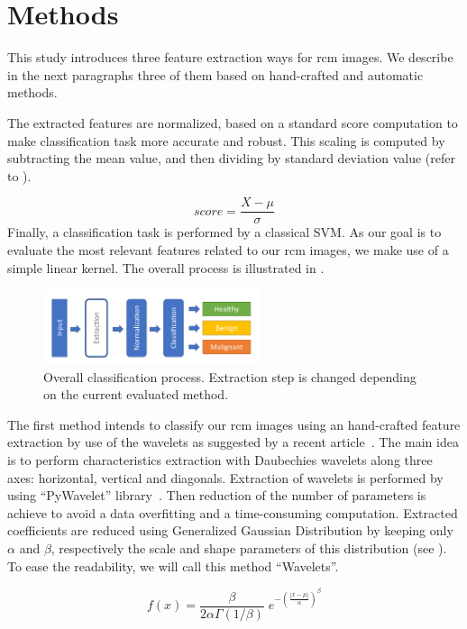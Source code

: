 \section{Methods}
\label{sec:methods}
This study introduces three feature extraction ways for \ac{rcm} images. We describe in the next paragraphs three of them based on hand-crafted and automatic methods.\par
The extracted features are normalized, based on a standard score computation to make classification task more accurate and robust. This scaling is computed by subtracting the mean value, and then dividing by standard deviation value (refer to ).\par
\begin{equation}
    score=\frac{X-\mu}{\sigma}
    \label{eq:standard_score}
\end{equation}
Finally, a classification task is performed by a classical SVM. As our goal is to evaluate the most relevant features related to our \ac{rcm} images, we make use of a simple linear kernel. The overall process is illustrated in .\par
\begin{figure}[h]
\centering
  \includegraphics[width=2.5in]{content/figures/Process.pdf}
  \caption{Overall classification process. Extraction step is changed depending on the current evaluated method.}
  \label{fig:pipeline}
\end{figure}
The first method intends to classify our \ac{rcm} images using an hand-crafted feature extraction by use of the wavelets as suggested by a recent article~\cite{Halimi2017a}. The main idea is to perform characteristics extraction with Daubechies wavelets along three axes: horizontal, vertical and diagonals. Extraction of wavelets is performed by using “PyWavelet” library~\cite{lee2006pywavelets}. Then reduction of the number of parameters is achieve to avoid a data overfitting and a time-consuming computation. Extracted coefficients are reduced using Generalized Gaussian Distribution by keeping only $\alpha$ and $\beta$, respectively the scale and shape parameters of this distribution (see ). To ease the readability, we will call this method “Wavelets”.\par
\begin{equation}
    f(x)= \frac{\beta}{2\alpha\Gamma(1/\beta)} \; e^{-\left(\frac{|x-\mu|}{\alpha}\right)^\beta}
    \label{eq:ggd}
\end{equation}
